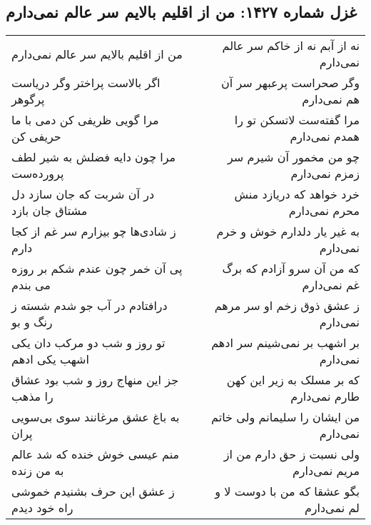 \begin{center}
\section*{غزل شماره ۱۴۲۷: من از اقلیم بالایم سر عالم نمی‌دارم}
\label{sec:1427}
\begin{longtable}{l p{0.5cm} r}
من از اقلیم بالایم سر عالم نمی‌دارم
&&
نه از آبم نه از خاکم سر عالم نمی‌دارم
\\
اگر بالاست پراختر وگر دریاست پرگوهر
&&
وگر صحراست پرعبهر سر آن هم نمی‌دارم
\\
مرا گویی ظریفی کن دمی با ما حریفی کن
&&
مرا گفته‌ست لاتسکن تو را همدم نمی‌دارم
\\
مرا چون دایه فضلش به شیر لطف پرورده‌ست
&&
چو من مخمور آن شیرم سر زمزم نمی‌دارم
\\
در آن شربت که جان سازد دل مشتاق جان بازد
&&
خرد خواهد که دریازد منش محرم نمی‌دارم
\\
ز شادی‌ها چو بیزارم سر غم از کجا دارم
&&
به غیر یار دلدارم خوش و خرم نمی‌دارم
\\
پی آن خمر چون عندم شکم بر روزه می بندم
&&
که من آن سرو آزادم که برگ غم نمی‌دارم
\\
درافتادم در آب جو شدم شسته ز رنگ و بو
&&
ز عشق ذوق زخم او سر مرهم نمی‌دارم
\\
تو روز و شب دو مرکب دان یکی اشهب یکی ادهم
&&
بر اشهب بر نمی‌شینم سر ادهم نمی‌دارم
\\
جز این منهاج روز و شب بود عشاق را مذهب
&&
که بر مسلک به زیر این کهن طارم نمی‌دارم
\\
به باغ عشق مرغانند سوی بی‌سویی پران
&&
من ایشان را سلیمانم ولی خاتم نمی‌دارم
\\
منم عیسی خوش خنده که شد عالم به من زنده
&&
ولی نسبت ز حق دارم من از مریم نمی‌دارم
\\
ز عشق این حرف بشنیدم خموشی راه خود دیدم
&&
بگو عشقا که من با دوست لا و لم نمی‌دارم
\\
\end{longtable}
\end{center}
